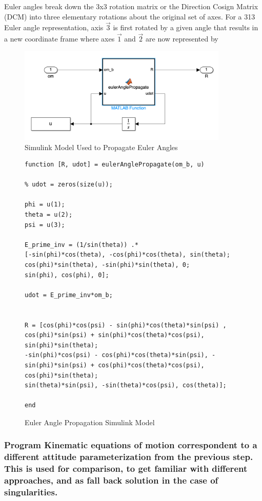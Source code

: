 Euler angles break down the 3x3 rotation matrix or the Direction Cosign Matrix (DCM) into three elementary rotations about the original set of axes. For a 313 
Euler angle representation, axis $\vec3$ is first rotated by a given angle that results in a new coordinate frame where axes $\vec1$ and $\vec2$ are now represented by 

\begin{figure}[H]
    \centering
    \captionsetup{justification = centering}
    \includegraphics[width = 10cm]{Images/simulink_euler_angle.png}
    \caption{Simulink Model Used to Propagate Euler Angles}
    \label{fig:simulink_euler_angles}
\end{figure}

\begin{figure} [H]
    \centering
    \begin{lstlisting}
function [R, udot] = eulerAnglePropagate(om_b, u)

% udot = zeros(size(u));

phi = u(1);
theta = u(2);
psi = u(3);

E_prime_inv = (1/sin(theta)) .* 
[-sin(phi)*cos(theta), -cos(phi)*cos(theta), sin(theta);
cos(phi)*sin(theta), -sin(phi)*sin(theta), 0;
sin(phi), cos(phi), 0];

udot = E_prime_inv*om_b;


R = [cos(phi)*cos(psi) - sin(phi)*cos(theta)*sin(psi) , cos(phi)*sin(psi) + sin(phi)*cos(theta)*cos(psi), sin(phi)*sin(theta);
-sin(phi)*cos(psi) - cos(phi)*cos(theta)*sin(psi), -sin(phi)*sin(psi) + cos(phi)*cos(theta)*cos(psi), cos(phi)*sin(theta);
sin(theta)*sin(psi), -sin(theta)*cos(psi), cos(theta)];

end
    \end{lstlisting}
    \caption{Euler Angle Propagation Simulink Model}
    \label{fig:euler_angle_prop_model}
\end{figure}

\subsubsection{Program Kinematic equations of motion correspondent to a different attitude parameterization from the previous step. This is used for comparison, to get familiar with different approaches, and as fall back solution in the case of singularities.}

